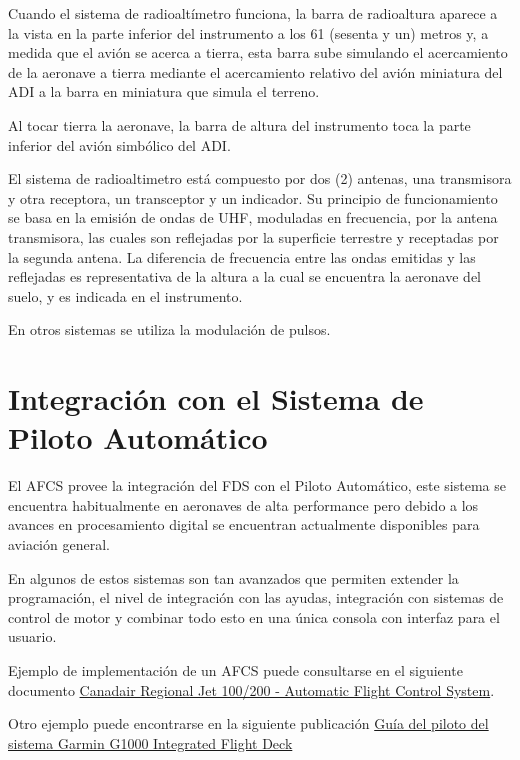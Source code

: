 Cuando el sistema de radioalt\'imetro funciona, la barra de radioaltura aparece a la vista
en la parte inferior del instrumento a los 61 (sesenta y un) metros y, a medida que
el avi\'on se acerca a tierra, esta barra sube simulando el acercamiento de la aeronave
a tierra mediante el acercamiento relativo del avi\'on miniatura del ADI
a la barra en miniatura que simula el terreno.

Al tocar tierra la aeronave, la barra de altura del instrumento toca la parte
inferior del avi\'on simb\'olico del ADI.

El sistema de radioaltimetro est\'a compuesto por dos (2) antenas, una transmisora
y otra receptora, un transceptor y un indicador.
Su principio de funcionamiento se basa en la emisi\'on de ondas de UHF, moduladas
en frecuencia, por la antena transmisora, las cuales son reflejadas por la superficie
terrestre y receptadas por la segunda antena. La diferencia de frecuencia entre
las ondas emitidas y las reflejadas es representativa de la altura a la cual se
encuentra la aeronave del suelo, y es indicada en el instrumento.

En otros sistemas se utiliza la modulaci\'on de pulsos.


\section{Integraci\'on con el Sistema de Piloto Autom\'atico}
\label{sec:07.AFCS}

El \ac{AFCS} provee la integraci\'on del \ac{FDS} con el Piloto Autom\'atico, este sistema se encuentra habitualmente en aeronaves de alta performance pero debido a los avances en procesamiento digital se encuentran actualmente disponibles para aviaci\'on general.

En algunos de estos sistemas son tan avanzados que permiten extender la programaci\'on, el nivel de integraci\'on con las ayudas, integraci\'on con sistemas de control de motor y combinar todo esto en una \'unica
consola con interfaz para el usuario.

\begin{tcolorbox}

 Ejemplo de implementaci\'on de un \ac{AFCS} puede consultarse en el siguiente documento 
  \href{http://www.smartcockpit.com/docs/Bombardier_CRJ_200-Automatic_Flight_Control_System.pdf}{Canadair
    Regional Jet 100/200 - Automatic Flight Control System}.

Otro ejemplo puede encontrarse en la siguiente publicaci\'on
\href{https://static.garmincdn.com/pumac/190-00498-07_0A_Web.pdf}{Gu\'ia del piloto del sistema Garmin G1000 Integrated Flight Deck}

\end{tcolorbox}

